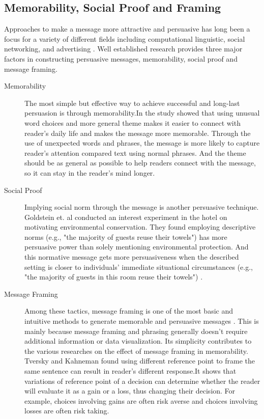 \subsection{Memorability, Social Proof and Framing}
Approaches to make a message more attractive and persuasive has long been a focus for a variety of different fields including computational linguistic, social networking, and advertising \cite{smith1996message,tversky1981framing,danescu2012you,huntertowards,maheswaran1990influence,grewal1994moderating}. Well established research provides three major factors in constructing persuasive messages, memorability, social proof and message framing.

\begin{description}
\item[Memorability]
The most simple but effective way to achieve successful and long-last persuasion is through memorability.In \cite{danescu2012you} the study showed that using unusual word choices and more general theme makes it easier to connect with reader’s daily life and makes the message more memorable. Through the use of unexpected words and phrases, the message is more likely to capture reader’s attention compared text using normal phrases. And the theme should be as general as possible to help readers connect with the message, so it can stay in the reader’s mind longer.

\item[Social Proof]
Implying social norm through the message is another persuasive technique.  Goldstein et. al conducted an interest experiment in the hotel on motivating environmental conservation. They found employing descriptive norms (e.g., "the majority of guests reuse their towels") has more persuasive power than solely mentioning environmental protection. And this normative message gets more persuasiveness when the described setting is closer to individuals' immediate situational circumstances (e.g., "the majority of guests in this room reuse their towels") \cite{goldstein2008room}.

\item[Message Framing]
Among these tactics, message framing is one of the most basic and intuitive methods to generate memorable and persuasive messages \cite{smith1996message,tversky1981framing}. This is mainly because message framing and phrasing generally doesn't require additional information or data visualization. Its simplicity contributes to the various researches on the effect of message framing in memorability. Tversky and Kahneman found using different reference point to frame the same sentence can result in reader's different response\cite{tversky1992advances,tversky1981framing,kahneman1984choices}.It shows that variations of reference point of a decision can determine whether the reader will evaluate it as a gain or a loss, thus changing their decision. For example, choices involving gains are often risk averse and choices involving losses are often risk taking.

\end{description}
